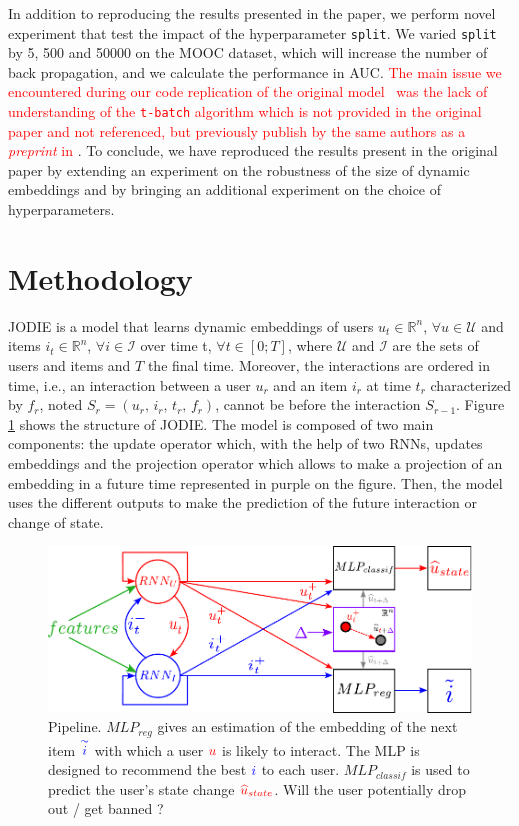 In addition to reproducing the results presented in the paper, we perform novel experiment that test the impact of the hyperparameter \texttt{split}. We varied \texttt{split} by 5, 500 and 50000 on the MOOC dataset, which will increase the number of back propagation, and we calculate the performance in AUC. \textcolor{red}{The main issue we encountered during our code replication of the original model~\cite{kumar2019predicting} was the lack of understanding of the \texttt{t-batch} algorithm which is not provided in the original paper and not referenced, but previously publish by the same authors as a \textit{preprint} in \cite{kumar18}}.
To conclude, we have reproduced the results present in the original paper by extending an experiment on the robustness of the size of dynamic embeddings and by bringing an additional experiment on the choice of hyperparameters.

\section*{Methodology}
JODIE is a model that learns dynamic embeddings of users $u_t \in \mathbb{R}^n$, $\forall u \in \mathcal{U}$ and items $i_t \in \mathbb{R}^n$, $\forall i \in \mathcal{I}$ over time t, $\forall t \in [0; T]$, where $\mathcal{U}$ and $\mathcal{I}$ are the sets of users and items and $T$ the final time. Moreover, the interactions are ordered in time, i.e., an interaction between a user $u_r$ and an item $i_r$ at time $t_r$ characterized by $f_r$, noted $S_r = (u_r, \, i_r, \, t_r, \, f_r)$, cannot be before the interaction $S_{r-1}$. Figure \ref{Pipeline} shows the structure of JODIE. The model is composed of two main components: the update operator which, with the help of two RNNs, updates embeddings and the projection operator which allows to make a projection of an embedding in a future time represented in purple on the figure. Then, the model uses the different outputs to make the prediction of the future interaction or change of state.


\begin{figure}[H]
    \begin{center}
        \includegraphics[width=1.0\textwidth]{image/pipeline.pdf}
    \end{center}
    \caption{Pipeline. $MLP_{reg}$ gives an estimation of the embedding of the next item $\textcolor{blue}{\overset{\sim}{i}}$ with which a user $\textcolor{red}{u}$ is likely to interact. The MLP  is designed to recommend the best $\textcolor{blue}{i}$ to each user. $MLP_{classif}$ is used to predict the user's state change $\textcolor{red}{\widehat u_{state}}$. Will the user potentially drop out / get banned ?}
    \label{Pipeline}
\end{figure}

